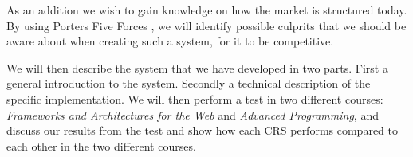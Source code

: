 As an addition we wish to gain knowledge on how the market is structured today. By using Porters Five Forces \cite{porter2008five}, we will identify possible culprits that we should be aware about when creating such a system, for it to be competitive.

We will then describe the system that we have developed in two parts. First a general introduction to the system. Secondly a technical description of the specific implementation.
We will then perform a test in two different courses: \emph{Frameworks and Architectures for the Web} and \emph{Advanced Programming}, and discuss our results from the test and show how each CRS performs compared to each other in the two different courses.






